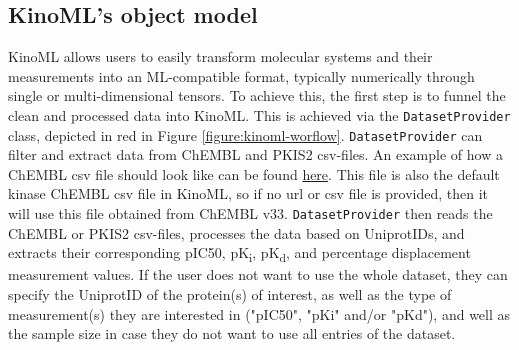 \documentclass[9pt,lessons]{livecoms}
\begin{document}
\subsection{KinoML's object model}



KinoML allows users to easily transform molecular systems and their measurements into an ML-compatible format, typically numerically through single or multi-dimensional tensors. To achieve this, the first step is to funnel the clean and processed data into KinoML. This is achieved via the \texttt{DatasetProvider} class, depicted in red in Figure \ref{figure:kinoml-worflow}. \texttt{DatasetProvider} can filter and extract data from ChEMBL and PKIS2 csv-files. An example of how a ChEMBL csv file should look like can be found \hyperlink{https://github.com/openkinome/kinodata/blob/master/data/human_kinases_and_chembl_targets.chembl_33.csv}{here}. This file is also the default kinase ChEMBL csv file in KinoML, so if no url or csv file is provided, then it will use this file obtained from ChEMBL v33. \texttt{DatasetProvider} then reads the ChEMBL or PKIS2 csv-files, processes the data based on UniprotIDs, and extracts their corresponding pIC50, pK\textsubscript{i}, pK\textsubscript{d}, and percentage displacement measurement values. If the user does not want to use the whole dataset, they can specify the UniprotID of the protein(s) of interest, as well as the type of measurement(s) they are interested in ("pIC50", "pKi" and/or "pKd"), and well as the sample size in case they do not want to use all entries of the dataset. 
\end{document}
